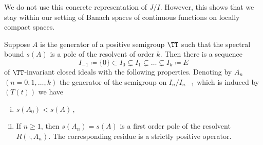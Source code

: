 We do not use this concrete representation of $J/I$.
However, this shows that we stay within our setting of Banach spaces of continuous functions on locally compact spaces.
\begin{lemma}\label{lem:b3-2.8}
Suppose $A$ is the generator of a positive semigroup $\TT$ such that the spectral bound $s(A)$ is a pole of the resolvent of order $k$.
	Then there is a sequence
	\begin{equation}\label{eq:b3-2.16}
		I_{-1} \coloneqq \{0\} \subset I_{0} \subsetneq I_{1} \subsetneq \ldots \subsetneq I_{k} \coloneqq E
	\end{equation}
	of $\TT$-invariant closed ideals with the following properties. 
Denoting by $A_{n}$ $(n = 0,1,\ldots,k)$ the generator of the semigroup on $I_{n}/I_{n-1}$ which is induced by $(T(t))$ we have
	\begin{enumerate}[(i)]
		\item 
		$s(A_{0}) < s(A)$\,,
		
		\item 
		If $n \geq 1$, then $s(A_{n}) = s(A)$ is a first order pole of the resolvent $R(\cdot,A_{n})$. The corresponding residue is a strictly positive operator.
	\end{enumerate}
\end{lemma}
